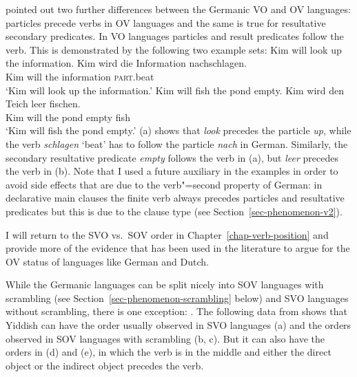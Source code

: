 \citet[Section~15.2]{Haider2020a} pointed out two further differences between the Germanic VO and OV languages:
particles precede verbs in OV languages and the same is true for resultative secondary
predicates. In VO languages particles and result predicates follow the verb. This is demonstrated by
the following two example sets:
\eal
\ex Kim will look up the information.
\ex 
\gll Kim wird die Information nachschlagen.\\
     Kim will the information \textsc{part}.beat\\
\glt `Kim will look up the information.'
\zl
\eal
\ex Kim will fish the pond empty.
\ex 
\gll Kim wird den Teich leer fischen.\\
     Kim will the pond  empty fish\\
\glt `Kim will fish the pond empty.'
\zl
(a) shows that \emph{look} precedes the particle \emph{up}, while the verb \emph{schlagen}
`beat' has to follow the particle \emph{nach} in German. Similarly, the secondary resultative
predicate \emph{empty} follows the verb in (a), but \emph{leer} precedes the verb in
(b). Note that I used a future auxiliary in the examples in order to avoid side effects that
are due to the verb"=second property of German: in declarative main clauses the finite verb always
precedes particles and resultative predicates but this is due to the clause type (see Section~\ref{sec-phenomenon-v2}).

I will return to the SVO vs.\ SOV order in Chapter~\ref{chap-verb-position} and provide more of the
evidence that has been used in the literature to argue for the OV status of languages like German and Dutch.

While the Germanic languages can be split nicely into SOV languages with scrambling (see
Section~\ref{sec-phenomenon-scrambling} below) and SVO languages without scrambling, there is one
exception: . The following data from \citet[]{Diesing97a} shows that Yiddish
can have the order usually observed in SVO languages (a) and the orders observed in SOV
languages with scrambling (b, c). But it can also have the orders in (d) and
(e), in which the verb is in the middle and either the direct object or the indirect object
precedes the verb.

